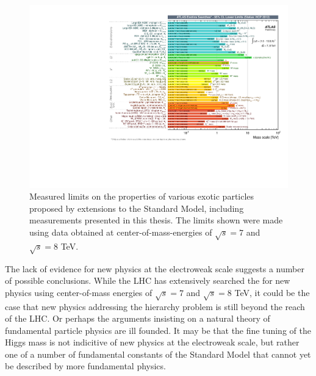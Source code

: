 \begin{figure}[ht!]
  \begin{center}
    \includegraphics[width=.75\textwidth]{figures/conclusion/ExoticResultsSummary}
    \caption{Measured limits on the properties of various exotic particles proposed by extensions to the Standard Model, including measurements presented in this thesis. The limits shown were made using data obtained at center-of-mass-energies of $\sqrt{s}=7$ and $\sqrt{s} = 8$ TeV.}
    \label{fig:xsec_vs_roots}
  \end{center}
\end{figure}

The lack of evidence for new physics at the electroweak scale suggests a number of possible conclusions.
While the LHC has extensively searched the for new physics using center-of-mass energies of $\sqrt{s}=7$ and $\sqrt{s} = 8$ TeV,
it could be the case that new physics addressing the hierarchy problem is still beyond the reach
of the LHC.%
Or perhaps the arguments insisting on a natural theory of fundamental particle physics are ill founded.
It may be that the fine tuning of the Higgs mass is not indicitive of new physics at the electroweak scale,
but rather one of a number of fundamental constants of the Standard Model that cannot yet be described
by more fundamental physics.


